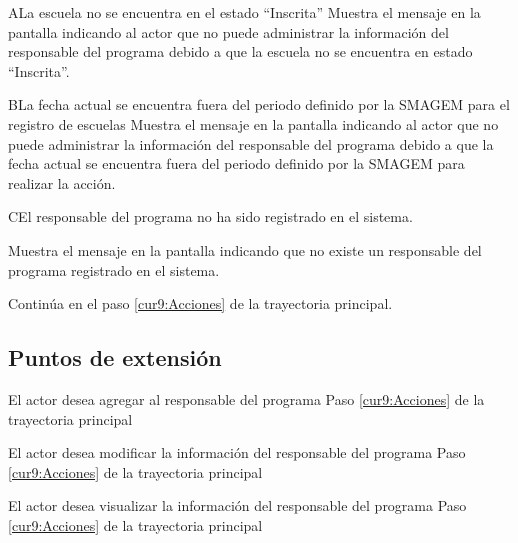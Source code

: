 
 \begin{UCtrayectoriaA}{A}{La escuela no se encuentra en el estado ``Inscrita''}
    \UCpaso[\UCsist] Muestra el mensaje  en la pantalla  indicando al actor que no puede administrar la información del responsable del programa debido a que la escuela no se encuentra en estado ``Inscrita''.
 \end{UCtrayectoriaA}

 \begin{UCtrayectoriaA}{B}{La fecha actual se encuentra fuera del periodo definido por la SMAGEM para el registro de escuelas}
    \UCpaso[\UCsist] Muestra el mensaje  en la pantalla  indicando al actor que no puede administrar la información del responsable del programa debido a que la fecha actual se encuentra fuera del periodo definido por la SMAGEM para realizar la acción.
 \end{UCtrayectoriaA} 

 	\begin{UCtrayectoriaA}{C}{El responsable del programa no ha sido registrado en el sistema.}

    \UCpaso[\UCsist] Muestra el mensaje  en la pantalla  indicando que no existe un responsable del programa registrado en el sistema.


      \UCpaso Continúa en el paso \ref{cur9:Acciones} de la trayectoria principal.
 \end{UCtrayectoriaA}


	\subsection{Puntos de extensión}

		\UCExtensionPoint
		{El actor desea agregar al responsable del programa}
		{ Paso \ref{cur9:Acciones} de la trayectoria principal}
		{}

		\UCExtensionPoint
		{El actor desea modificar la información del responsable del programa}
		{ Paso \ref{cur9:Acciones} de la trayectoria principal}
		{}

		\UCExtensionPoint
		{El actor desea visualizar la información del responsable del programa}
		{ Paso \ref{cur9:Acciones} de la trayectoria principal}
		{}
